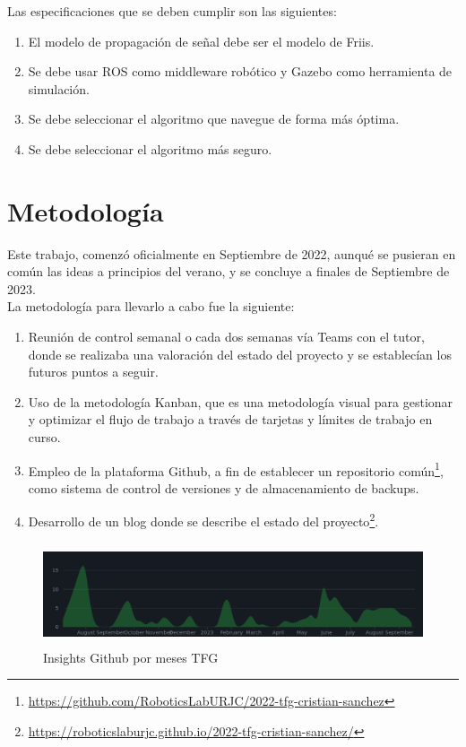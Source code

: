 Las especificaciones que se deben cumplir son las siguientes:

\begin{enumerate}
	\item El modelo de propagación de señal debe ser el modelo de Friis.
	\item Se debe usar \ac{ROS} como middleware robótico y Gazebo como herramienta de simulación.
	\item Se debe seleccionar el algoritmo que navegue de forma más óptima.
	\item Se debe seleccionar el algoritmo más seguro.
\end{enumerate}

\section{Metodología}
\label{sec:metodologia}

Este trabajo, comenzó oficialmente en Septiembre de 2022, aunqué se pusieran en común las ideas a principios del verano, y se concluye a finales de Septiembre de 2023.\\ 

La metodología para llevarlo a cabo fue la siguiente:

\begin{enumerate}
	\item Reunión de control semanal o cada dos semanas vía Teams con el tutor, donde se realizaba una valoración del estado del proyecto y se establecían los futuros puntos a seguir.
	\item Uso de la metodología Kanban, que es una metodología visual para gestionar y optimizar el flujo de trabajo a través de tarjetas y límites de trabajo en curso.
	\item Empleo de la plataforma Github, a fin de establecer un repositorio común\footnote[1]{\url{https://github.com/RoboticsLabURJC/2022-tfg-cristian-sanchez}}, como sistema de control de versiones y de almacenamiento de backups.
	\item Desarrollo de un blog donde se describe el estado del proyecto\footnote[2]{\url{https://roboticslaburjc.github.io/2022-tfg-cristian-sanchez/}}.
\end{enumerate}

\begin{figure} [H]
	\begin{center}
	\includegraphics[height=3cm]{imagenes/cap2/1_insights.png}
	\end{center}
	\caption[Insights Github por meses \ac{TFG}]{Insights Github por meses \ac{TFG}}
	\label{fig:insights}
\end{figure}

